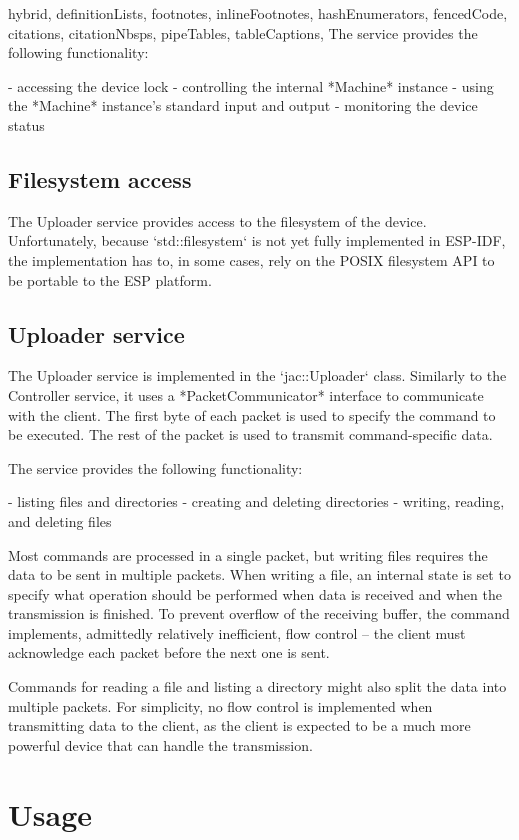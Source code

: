 \documentclass[
  digital,
  oneside,
  nosansbold,
  nocolorbold,
  lof,
  lot
]{fithesis4}
\begin{document}
\begin{markdown*}{%
  hybrid,
  definitionLists,
  footnotes,
  inlineFootnotes,
  hashEnumerators,
  fencedCode,
  citations,
  citationNbsps,
  pipeTables,
  tableCaptions,
}
The service provides the following functionality:

  - accessing the device lock
  - controlling the internal *Machine* instance
  - using the *Machine* instance's standard input and output
  - monitoring the device status

\subsection{Filesystem access}

The Uploader service provides access to the filesystem of the device. Unfortunately, because `std::filesystem` is not yet fully implemented in ESP-IDF, the implementation has to, in some cases, rely on the POSIX filesystem API to be portable to the ESP platform.

\subsection{Uploader service}

The Uploader service is implemented in the `jac::Uploader` class. Similarly to the Controller service, it uses a *PacketCommunicator* interface to communicate with the client. The first byte of each packet is used to specify the command to be executed. The rest of the packet is used to transmit command-specific data.

The service provides the following functionality:

  - listing files and directories
  - creating and deleting directories
  - writing, reading, and deleting files

Most commands are processed in a single packet, but writing files requires the data to be sent in multiple packets. When writing a file, an internal state is set to specify what operation should be performed when data is received and when the transmission is finished. To prevent overflow of the receiving buffer, the command implements, admittedly relatively inefficient, flow control -- the client must acknowledge each packet before the next one is sent.

Commands for reading a file and listing a directory might also split the data into multiple packets. For simplicity, no flow control is implemented when transmitting data to the client, as the client is expected to be a much more powerful device that can handle the transmission.


\section{Usage}


\end{markdown*}
\end{document}
